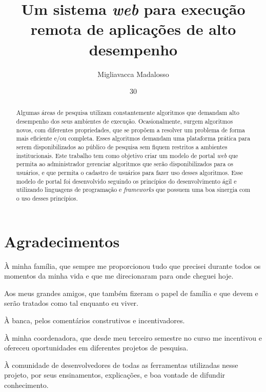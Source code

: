 \documentclass[tg]{mdtufsm}
\title{Um sistema \emph{ web } para execução remota de aplicações de alto desempenho}
\author{Migliavacca Madalosso}{Otávio}
\institute{Centro de Tecnologia}
\date{30}{Novembro}{2015}
\begin{document}
\maketitle
\makeapprove

\chapter*{Agradecimentos}
À minha família, que sempre me proporcionou tudo que precisei durante todos os momentos da minha vida e que me direcionaram para onde cheguei hoje.

Aos meus grandes amigos, que também fizeram o papel de família e que devem e serão tratados como tal enquanto eu viver.

À banca, pelos comentários construtivos e incentivadores.

À minha coordenadora, que desde meu terceiro semestre no curso me incentivou e ofereceu oportunidades em diferentes projetos de pesquisa.

À comunidade de desenvolvedores de todas as ferramentas utilizadas nesse projeto, por seus ensinamentos, explicações, e boa vontade de difundir conhecimento.

\begin{abstract}
Algumas áreas de pesquisa utilizam constantemente algoritmos que demandam alto desempenho dos seus ambientes de execução. Ocasionalmente, surgem algoritmos novos, com diferentes propriedades, que se propõem a resolver um problema de forma mais eficiente e/ou completa. Esses algoritmos demandam uma plataforma prática para serem disponibilizados ao público de pesquisa sem fiquem restritos a ambientes institucionais. Este trabalho tem como objetivo criar um modelo de portal \emph{web} que permita ao administrador gerenciar algoritmos que serão disponibilizados para os usuários, e que permita o cadastro de usuários para fazer uso desses algoritmos. Esse modelo de portal foi desenvolvido seguindo os princípios do desenvolvimento ágil e utilizando linguagens de programação e \emph{frameworks} que possuem uma boa sinergia com o uso desses princípios.
\end{abstract}



\tableofcontents
\listoffigures

\setlength{\baselineskip}{1.5\baselineskip}

\end{document}
